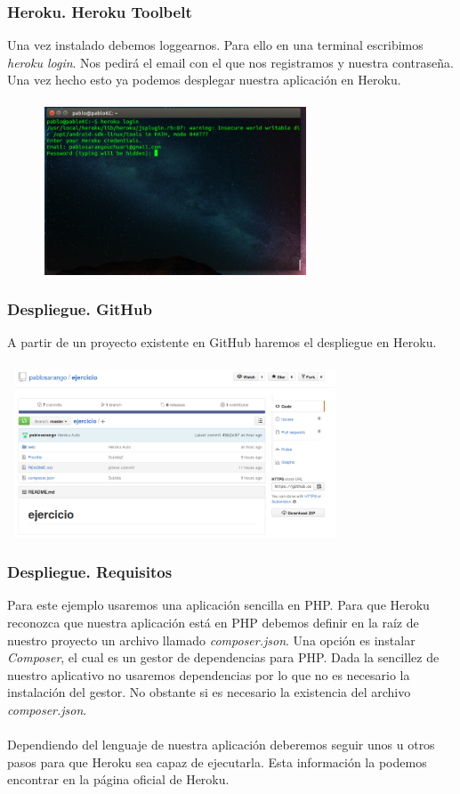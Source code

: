 \documentclass{beamer}
\begin{document}
\begin{frame}
\frametitle{Heroku. Heroku Toolbelt}
Una vez instalado debemos loggearnos. Para ello en una terminal escribimos \textit{heroku login}. Nos pedirá el email con el que nos registramos y nuestra contraseña. Una vez hecho esto ya podemos desplegar nuestra aplicación en Heroku.\\ \ \\
\includegraphics[width=10cm, height=5cm]{githubHeroku/5.png}
\end{frame}

\begin{frame}
\frametitle{Despliegue. GitHub}
A partir de un proyecto existente en GitHub haremos el despliegue en Heroku.\\ \ \\
\includegraphics[width=10cm, height=5cm]{githubHeroku/24.png}
\end{frame}

\begin{frame}
\frametitle{Despliegue. Requisitos}
Para este ejemplo usaremos una aplicación sencilla en PHP. Para que Heroku reconozca que nuestra aplicación está en PHP debemos definir en la raíz de nuestro proyecto un archivo llamado \textit{composer.json}. Una opción es instalar \textit{Composer}, el cual es un gestor de dependencias para PHP. Dada la sencillez de nuestro aplicativo no usaremos dependencias por lo que no es necesario la instalación del gestor. No obstante si es necesario la existencia del archivo \textit{composer.json}.\\ \ \\
Dependiendo del lenguaje de nuestra aplicación deberemos seguir unos u otros pasos para que Heroku sea capaz de ejecutarla. Esta información la podemos encontrar en la página oficial de Heroku.
\end{frame}
\end{document}

